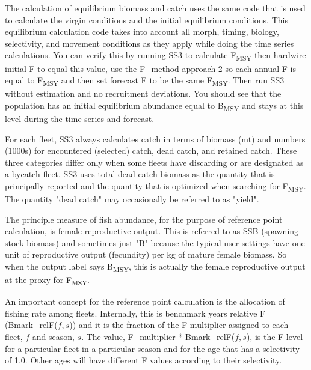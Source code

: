 The calculation of equilibrium biomass and catch uses the same code that is used to calculate the virgin conditions and the initial equilibrium conditions.  This equilibrium calculation code takes into account all morph, timing, biology, selectivity, and movement conditions as they apply while doing the time series calculations.  You can verify this by running SS3 to calculate F\textsubscript{MSY} then hardwire initial F to equal this value, use the F\_method approach 2 so each annual F is equal to F\textsubscript{MSY} and then set forecast F to be the same F\textsubscript{MSY}.  Then run SS3 without estimation and no recruitment deviations.  You should see that the population has an initial equilibrium abundance equal to B\textsubscript{MSY} and stays at this level during the time series and forecast.

\pagebreak
{}
For each fleet, SS3 always calculates catch in terms of biomass (mt) and numbers (1000s) for encountered (selected) catch, dead catch, and retained catch.  These three categories differ only when some fleets have discarding or are designated as a bycatch fleet.  SS3 uses total dead catch biomass as the quantity that is principally reported and the quantity that is optimized when searching for F\textsubscript{MSY}.  The quantity "dead catch" may occasionally be referred to as "yield".

The principle measure of fish abundance, for the purpose of reference point calculation, is female reproductive output.  This is referred to as SSB (spawning stock biomass) and sometimes just "B" because the typical user settings have one unit of reproductive output (fecundity) per kg of mature female biomass.  So when the output label says B\textsubscript{MSY}, this is actually the female reproductive output at the proxy for F\textsubscript{MSY}.

An important concept for the reference point calculation is the allocation of fishing rate among fleets.  Internally, this is benchmark years relative F (Bmark\_relF($f,s$)) and it is the fraction of the F multiplier assigned to each fleet, $f$ and season, $s$.  The value, F\_multiplier * Bmark\_relF($f,s$), is the F level for a particular fleet in a particular season and for the age that has a selectivity of 1.0.  Other ages will have different F values according to their selectivity.

